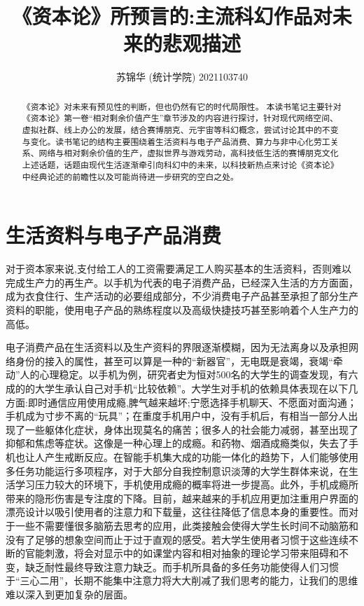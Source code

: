 \documentclass{ctexart}
\title{《资本论》所预言的:主流科幻作品对未来的悲观描述}
\author{苏锦华  (统计学院) 2021103740}
\begin{document}
\maketitle

\begin{abstract}
      《资本论》对未来有预见性的判断，但也仍然有它的时代局限性。
      本读书笔记主要针对《资本论》第一卷“相对剩余价值产生”章节涉及的内容进行探讨，针对现代网络空间、虚拟社群、线上办公的发展，结合赛博朋克、元宇宙等科幻概念，尝试讨论其中的不变与变化。读书笔记的结构主要围绕着生活资料与电子产品消费、算力与非中心化劳工关系、网络与相对剩余价值的生产，虚拟世界与游戏劳动，高科技低生活的赛博朋克文化上述话题，话题由现代生活逐渐牵引向科幻中的未来，以科技新热点来讨论《资本论》中经典论述的前瞻性以及可能尚待进一步研究的空白之处。
\end{abstract}

\section{生活资料与电子产品消费}


对于资本家来说,支付给工人的工资需要满足工人购买基本的生活资料，否则难以完成生产力的再生产\cite{马克思2004资本论}。以手机为代表的电子消费产品，已经深入生活的方方面面，成为衣食住行、生产活动的必要组成部分，不少消费电子产品甚至承担了部分生产资料的职能，使用电子产品的熟练程度以及高级快捷技巧甚至影响着个人生产力的高低。

电子消费产品在生活资料以及生产资料的界限逐渐模糊，因为无法离身以及承担网络身份的接入的属性，甚至可以算是一种的“新器官”，无电既是衰竭，衰竭“牵动”人的心理稳定。以手机为例，研究者史为恒对500名的大学生的调查发现，有六成的的大学生承认自己对手机“比较依赖”。大学生对手机的依赖具体表现在以下几方面:即时通信应用使用成瘾,脾气越来越坏;宁愿选择手机聊天、不愿面对面沟通；手机成为寸步不离的“玩具”；在重度手机用户中，没有手机后，有相当一部分人出现了一些躯体化症状，身体出现莫名的痛苦；很多人的社会能力减弱，甚至出现了抑郁和焦虑等症状。这像是一种心理上的成瘾。和药物、烟酒成瘾类似，失去了手机也让人产生戒断反应。在智能手机集大成的功能一体化的趋势下，人们能够使用多任务功能运行多项程序，对于大部分自我控制意识淡薄的大学生群体来说，在生活学习压力较大的环境下，手机使用成瘾的概率将进一步提高。此外，手机成瘾所带来的隐形伤害是专注度的下降。目前，越来越来的手机应用更加注重用户界面的漂亮设计以吸引使用者的注意力和下载量，这往往降低了信息本身的重要性。而对于一些不需要懂很多脑筋去思考的应用，此类接触会使得大学生长时间不动脑筋和没有了足够的想象空间而止于过于直观的感受。若大学生使用者习惯于这些连续不断的官能刺激，将会对显示中的如课堂内容和相对抽象的理论学习带来阻碍和不变，缺乏耐性最终导致注意力缺乏。而手机所具备的多任务功能使得人们习惯于“三心二用”，长期不能集中注意力将大大削减了我们思考的能力，让我们的思维难以深入到更加复杂的层面。
\end{document}
